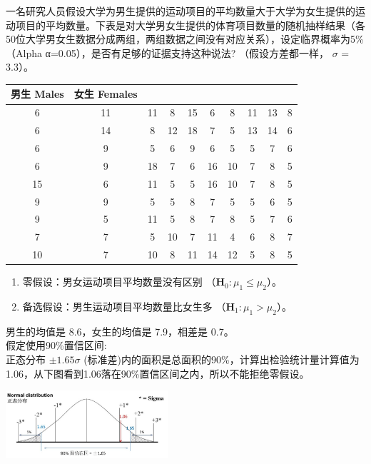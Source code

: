 一名研究人员假设大学为男生提供的运动项目的平均数量大于大学为女生提供的运动项目的平均数量。下表是对大学男女生提供的体育项目数量的随机抽样结果（各50位大学男女生数据分成两组，两组数据之间没有对应关系），设定临界概率为5\%
（Alpha α=0.05），是否有足够的证据支持这种说法? （假设方差都一样，
\(\sigma\) = 3.3）。



\begin{tabular}{|c|c|c|c|c|c|c|c|c|c|}
\hline
\multirow{5}{*}{男生 Males}&\multirow{5}{*}{女生 Females }\\
\hline
6&11&11&8&15&6&8&11&13&8\\
\hline
6&14&8&12&18&7&5&13&14&6\\
\hline
6&9&5&6&9&6&5&5&7&6\\
\hline
6&9&18&7&6&16&10&7&8&5\\
\hline
15&6&11&5&5&16&10&7&8&5\\
\hline
9&9&5&5&8&7&5&5&6&5\\
\hline
9&5&11&5&8&7&8&5&7&6\\
\hline
7&7&5&10&7&11&4&6&8&7\\
\hline
10&7&10&8&11&14&12&5&8&5\\
\hline
\end{tabular}

\begin{enumerate}
\tightlist
\item
  零假设：男女运动项目平均数量没有区别
  （\(\mathbf{H}_0: {\mu}_1 \le  {\mu}_2\)）。
\item
  备选假设：男生运动项目平均数量比女生多
  （\(\mathbf{H}_1: {\mu}_1 > {\mu}_2\)）。
\end{enumerate}

男生的均值是 8.6，女生的均值是 7.9，相差是 0.7。\\
假定使用90\%置信区间:\\
正态分布 \(\pm 1.65{\sigma}\)
(标准差)内的面积是总面积的90\%，计算出检验统计量计算值为1.06，从下图看到1.06落在90\%置信区间之内，所以不能拒绝零假设。


\includegraphics[width=6cm]{M4twoPopulationScreenshot_2022-09-11_201946.jpg}

